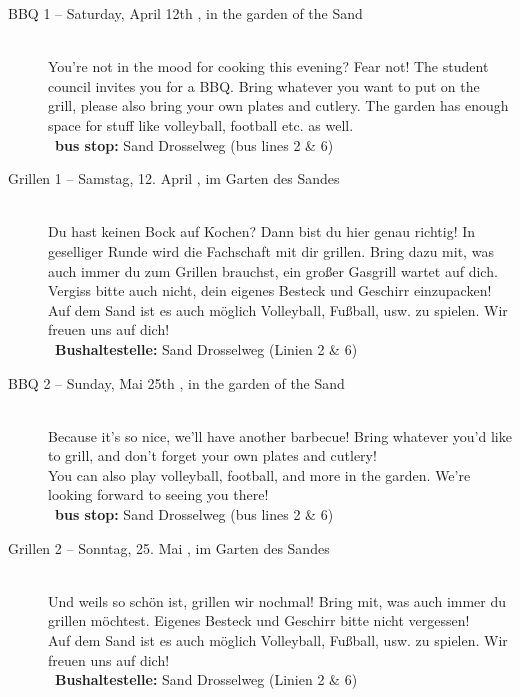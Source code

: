 \begin{description}
\ifml
    \item[BBQ 1 -- Saturday, April 12th \YEAR, in the garden of the Sand]~\\
    You're not in the mood for cooking this evening? Fear not!
    The student council invites you for a BBQ. Bring whatever you want to put on the grill,
    please also bring your own plates and cutlery. The garden has enough space for stuff like volleyball, football etc. as well.\\
    ~\textbf{bus stop:} Sand Drosselweg (bus lines 2 \& 6)
\else
    \item[Grillen 1 -- Samstag, 12. April \YEAR, im Garten des Sandes]~\\
    Du hast keinen Bock auf Kochen? Dann bist du hier genau richtig! In geselliger Runde wird die Fachschaft mit dir grillen.
    Bring dazu mit, was auch immer du zum Grillen brauchst, ein großer Gasgrill wartet auf dich. Vergiss bitte auch nicht, dein eigenes Besteck und Geschirr einzupacken!\\
    Auf dem Sand ist es auch möglich Volleyball, Fußball, usw. zu spielen. Wir freuen uns auf dich!\\
    ~\textbf{Bushaltestelle:} Sand Drosselweg (Linien 2 \& 6)
\fi

\ifml
    \item[BBQ 2 -- Sunday, Mai 25th \YEAR, in the garden of the Sand]~\\
    Because it's so nice, we'll have another barbecue!
    Bring whatever you'd like to grill, and don’t forget your own plates and cutlery!\\
    You can also play volleyball, football, and more in the garden. We’re looking forward to seeing you there!\\
    ~\textbf{bus stop:} Sand Drosselweg (bus lines 2 \& 6)
\else
    \item[Grillen 2 -- Sonntag, 25. Mai \YEAR, im Garten des Sandes]~\\
    Und weils so schön ist, grillen wir nochmal!
    Bring mit, was auch immer du grillen möchtest. Eigenes Besteck und Geschirr bitte nicht vergessen!\\
    Auf dem Sand ist es auch möglich Volleyball, Fußball, usw. zu spielen. Wir freuen uns auf dich!\\
    ~\textbf{Bushaltestelle:} Sand Drosselweg (Linien 2 \& 6)
\fi


\end{description}
